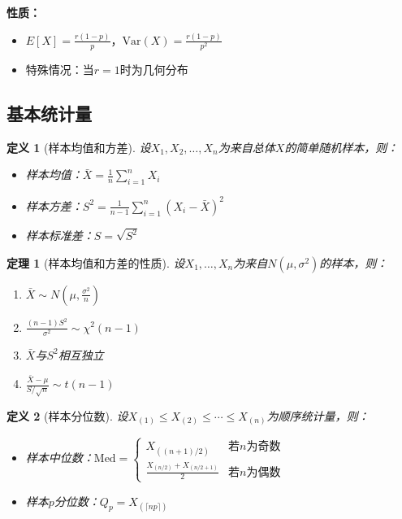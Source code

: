 \documentclass[12pt,a4paper]{article}
\newtheorem{theorem}{定理}[section]
\newtheorem{definition}{定义}[section]
\theoremstyle{remark}
\begin{document}
\textbf{性质：}
\begin{itemize}
\item $E[X] = \frac{r(1-p)}{p}$，$\text{Var}(X) = \frac{r(1-p)}{p^2}$
\item 特殊情况：当$r = 1$时为几何分布
\end{itemize}

\subsection{基本统计量}

\begin{definition}[样本均值和方差]
设$X_1, X_2, \ldots, X_n$为来自总体$X$的简单随机样本，则：
\begin{itemize}
\item 样本均值：$\bar{X} = \frac{1}{n}\sum_{i=1}^n X_i$
\item 样本方差：$S^2 = \frac{1}{n-1}\sum_{i=1}^n (X_i - \bar{X})^2$
\item 样本标准差：$S = \sqrt{S^2}$
\end{itemize}
\end{definition}

\begin{theorem}[样本均值和方差的性质]
设$X_1, \ldots, X_n$为来自$N(\mu, \sigma^2)$的样本，则：
\begin{enumerate}
\item $\bar{X} \sim N\left(\mu, \frac{\sigma^2}{n}\right)$
\item $\frac{(n-1)S^2}{\sigma^2} \sim \chi^2(n-1)$
\item $\bar{X}$与$S^2$相互独立
\item $\frac{\bar{X} - \mu}{S/\sqrt{n}} \sim t(n-1)$
\end{enumerate}
\end{theorem}

\begin{definition}[样本分位数]
设$X_{(1)} \leq X_{(2)} \leq \cdots \leq X_{(n)}$为顺序统计量，则：
\begin{itemize}
\item 样本中位数：$\text{Med} = \begin{cases} X_{((n+1)/2)} & \text{若}n\text{为奇数} \\ \frac{X_{(n/2)} + X_{(n/2+1)}}{2} & \text{若}n\text{为偶数} \end{cases}$
\item 样本$p$分位数：$Q_p = X_{(\lceil np \rceil)}$
\end{itemize}
\end{definition}
\end{document}
